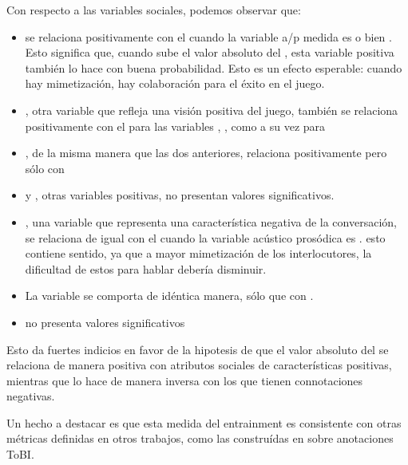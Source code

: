 Con respecto a las variables sociales, podemos observar que:

\begin{itemize}
  \item \svcontributes se relaciona positivamente con el \absentrainment cuando la variable a/p medida es \FOMEAN o bien \NOISETOHARMONICS. Esto significa que, cuando sube el valor absoluto del \entrainment, esta variable positiva también lo hace con buena probabilidad. Esto es un efecto esperable: cuando hay mimetización, hay colaboración para el éxito en el juego.
  \item \svclear, otra variable que refleja una visión positiva del juego, también se relaciona positivamente con el \absentrainment para las variables \FOMEAN, \NOISETOHARMONICS, \ENGMAX como a su vez para \PHONAVG
  \item \svengaged, de la misma manera que las dos anteriores, relaciona positivamente pero sólo con \FOMEAN
  \item \svplanning y \svencourages, otras variables positivas, no presentan valores significativos.
  \item \svdifficult, una variable que representa una característica negativa de la conversación, se relaciona de igual con el \absentrainment cuando la variable acústico prosódica es \ENGMAX. esto contiene sentido, ya que a mayor mimetización de los interlocutores, la dificultad de estos para hablar debería disminuir.
  \item La variable \svbored se comporta de idéntica manera, sólo que con \FOMEAN.
  \item \svdislikes no presenta valores significativos
\end{itemize}

Esto da fuertes indicios en favor de la hipotesis de que el valor absoluto del \entrainment se relaciona de manera positiva con atributos sociales de características positivas, mientras que lo hace de manera inversa con los que tienen connotaciones negativas.

Un hecho a destacar es que esta medida del entrainment es consistente con otras métricas definidas en otros trabajos, como las construídas en \cite{gravano2015backward} sobre anotaciones ToBI.



